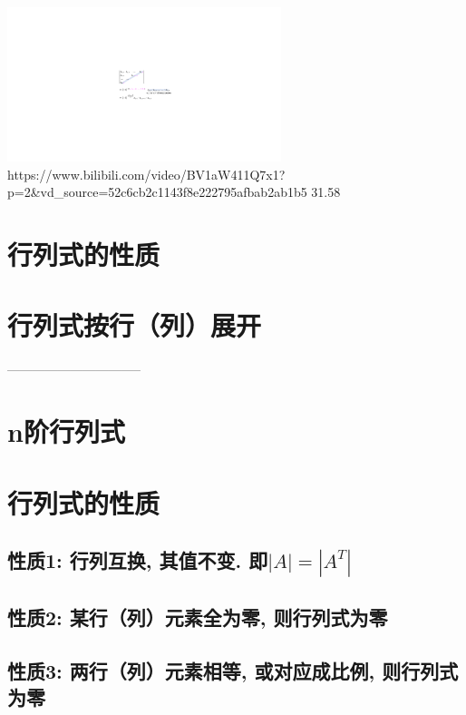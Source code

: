 \documentclass[UTF8]{ctexart}
\begin{document}
\includegraphics[width=0.6\textwidth]{img/0005.pdf}\\




https://www.bilibili.com/video/BV1aW411Q7x1?p=2&vd_source=52c6cb2c1143f8e222795afbab2ab1b5
31.58
	
	
	
	\section{行列式的性质}
	
	
	\section{行列式按行（列）展开}
	
	
	
	
	--------------------------------
	
	\section{n阶行列式}
	
	
	\section{行列式的性质}
	
	\subsection{性质1: 行列互换, 其值不变. 即$|A|=\left| A^T \right|$}
	
	\subsection{性质2: 某行（列）元素全为零, 则行列式为零}
	
	\subsection{性质3: 两行（列）元素相等, 或对应成比例, 则行列式为零}
	
\end{document}
